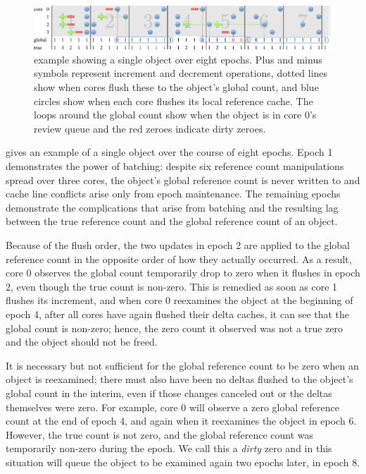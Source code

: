 \begin{figure}
  \centering
  \includegraphics[width=\textwidth]{figures/refcache.pdf}
  \caption{ example showing a single object over eight
    epochs.  Plus and minus symbols represent increment and decrement
    operations, dotted lines show when cores flush these to the object's
    global count, and blue circles show when each core flushes its
    local reference cache.  The loops around the global count show
    when the object is in core 0's review queue and
    the red zeroes indicate dirty zeroes.}
  \label{fig:refcache-ex}
\end{figure}

 gives an example of a single object over
the course of eight epochs.  Epoch 1 demonstrates the power of
batching: despite six reference count manipulations spread over three
cores, the object's global reference count is never written to and
cache line conflicts arise only from epoch maintenance.  The
remaining epochs demonstrate the complications that arise from
batching and the resulting lag between the true reference count and
the global reference count of an object.

Because of the flush order, the two updates in epoch 2 are applied to
the global reference count in the opposite order of how they actually
occurred.  As a result, core 0 observes the global count temporarily
drop to zero when it flushes in epoch 2, even though the true count is
non-zero.  This is remedied as soon as core 1 flushes its increment,
and when core 0 reexamines the object at the beginning of epoch 4,
after all cores have again flushed their delta caches, it can see
that the global count is non-zero; hence, the zero count it observed
was not a true zero and the object should not be freed.

It is necessary but not sufficient for the global reference count to
be zero when an object is reexamined; there must also have been no
deltas flushed to the object's global count in the interim, even if
those changes canceled out or the deltas themselves were zero.
%
For example, core 0 will observe a zero global reference count
at the end of epoch 4, and again when it reexamines the object in
epoch 6.  However, the true count is not zero, and the global
reference count was temporarily non-zero during the epoch.  We call
this a \emph{dirty} zero and in this situation  will
queue the object to be examined again two epochs later, in epoch 8.

